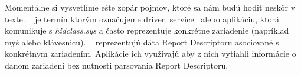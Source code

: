 Momentálne si vysvetlíme ešte zopár pojmov, ktoré sa nám budú hodiť neskôr v texte. ~\cite{usb_msdn_hid_client} je termín ktorým označujeme driver, service~\cite{usb_msdn_service} alebo aplikáciu, ktorá komunikuje s \textit{hidclass.sys} a často reprezentuje konkrétne zariadenie (napríklad myš alebo klávesnicu). ~\cite{usb_msdn_preparsed_data} reprezentujú dáta Report Descriptoru asociované s konkrétnym zariadením. Aplikácie ich využívajú aby z nich vytiahli informácie o danom zariadení bez nutnosti parsovania Report Descriptoru.